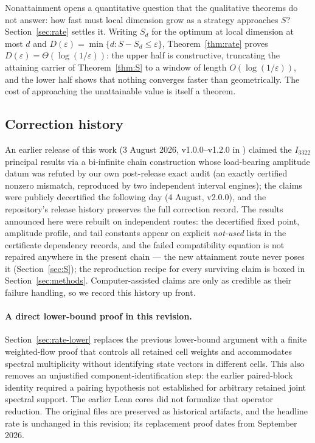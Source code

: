\documentclass[11pt]{article}
\theoremstyle{remark}
\newcommand{\eps}{\varepsilon}
\begin{document}
Nonattainment opens a quantitative question that the qualitative theorems
do not answer: how fast must local dimension grow as a strategy approaches
$S$? Section~\ref{sec:rate} settles it. Writing $S_d$ for the optimum at
local dimension at most $d$ and $D(\eps)=\min\{d:S-S_d\le\eps\}$,
Theorem~\ref{thm:rate} proves $D(\eps)=\Theta(\log(1/\eps))$: the upper
half is constructive, truncating the attaining carrier of
Theorem~\ref{thm:S} to a window of length $O(\log(1/\eps))$, and the lower
half shows that nothing converges faster than geometrically. The cost of
approaching the unattainable value is itself a theorem.

\subsection*{Correction history}

An earlier release of this work (3 August 2026, v1.0.0--v1.2.0 in
\cite{Repo}) claimed the $I_{3322}$ principal results via a
bi-infinite chain construction whose load-bearing amplitude datum was refuted
by our own post-release exact audit (an exactly certified nonzero mismatch,
reproduced by two independent interval engines); the claims were publicly
decertified the following day (4 August, v2.0.0), and the repository's
release history preserves the full correction record. The results announced here were rebuilt on
independent routes: the decertified fixed point, amplitude profile, and tail
constants appear on explicit \emph{not-used} lists in the certificate
dependency records, and the failed compatibility equation is not repaired
anywhere in the present chain --- the new attainment route never poses it
(Section~\ref{sec:S}); the reproduction recipe for every surviving claim is
boxed in Section~\ref{sec:methods}. Computer-assisted claims are only as
credible as
their failure handling, so we record this history up front.

\paragraph{A direct lower-bound proof in this revision.}
Section~\ref{sec:rate-lower} replaces the previous lower-bound argument
with a finite weighted-flow proof that controls all retained cell weights
and accommodates spectral multiplicity without identifying state vectors
in different cells. This also removes an unjustified component-identification
step: the earlier paired-block identity required a pairing hypothesis
not established for arbitrary retained joint spectral support.
The earlier Lean cores did not formalize that operator reduction.
The original files are preserved as historical artifacts, and the
headline rate is unchanged in this revision;
its replacement proof dates from September 2026.
\end{document}
